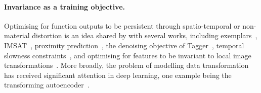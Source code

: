 \paragraph{Invariance as a training objective.}

Optimising for function outputs to be persistent through spatio-temporal or non-material distortion is an idea shared by \methodnameshort with several works, including exemplars~\cite{dosovitskiy2015discriminative}, IMSAT~\cite{hu2017learning}, proximity prediction~\cite{isola2015learning}, the denoising objective of Tagger~\cite{greff2016tagger}, temporal slowness constraints~\cite{zou2012deep}, and optimising for features to be invariant to local image transformations~\cite{sohn2012learning,hui2013direct}.
More broadly, the problem of modelling data transformation has received significant attention in deep learning, one example being the transforming autoencoder~\cite{hinton2011transforming}.





